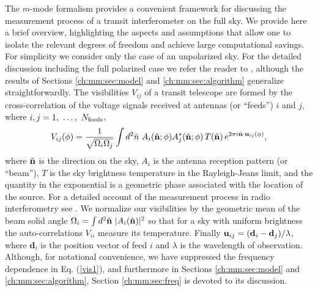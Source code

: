 The $m$-mode formalism provides a convenient framework for discussing the measurement process of a transit interferometer on the full sky. We provide here a brief overview, highlighting the aspects and assumptions that allow one to isolate the relevant degrees of freedom and achieve large computational savings. For simplicity we consider only the case of an unpolarized sky. For the detailed discussion including the full polarized case we refer the reader to \cite{mmodes2}, although the results of Sections \ref{ch:mm:sec:model} and \ref{ch:mm:sec:algorithm} generalize straightforwardly. The visibilities $V_{ij}$ of a transit telescope are formed by the cross-correlation of the voltage signals received at antennas (or ``feeds'') $i$ and $j$, where $i,j=1,~\dots,~N_{\rm feeds}$,
\begin{equation}
V_{ij}(\phi) = \frac{1}{\sqrt{\Omega_{i}\Omega_{j}}} \int d^2\hat{n} ~ A_i(\hat{\mathbf{n}}; \phi) A^*_j(\hat{\mathbf{n}}; \phi) \, T(\hat{\mathbf{n}}) \, e^{2\pi i\hat{\mathbf{n}} \cdot \mathbf{u}_{ij}(\phi)},
\label{vis1}
\end{equation}
 where $\hat{\mathbf{n}}$ is the direction on the sky, $A_i$ is the antenna reception pattern (or ``beam''), $T$ is the sky brightness temperature in the Rayleigh-Jeans limit, and the quantity in the exponential is a geometric phase associated with the location of the source. For a detailed account of the measurement process in radio interferometry see \cite{radio1}. We normalize our visibilities by the geometric mean of the beam solid angle $\Omega_i =\int d^2\hat{\mathbf{n}}~|A_i({\hat{\mathbf{n}}})|^2$ so that for a sky with uniform brightness the auto-correlations $V_{ii}$ measure its temperature. Finally ${\bf u}_{ij} = (\mathbf{d}_{i} - \mathbf{d}_{j})/\lambda$, where $\mathbf{d}_{i}$ is the position vector of feed $i$ and $\lambda$ is the wavelength of observation. Although, for notational convenience, we have suppressed the frequency dependence in Eq. (\ref{vis1}), and furthermore in Sections \ref{ch:mm:sec:model} and \ref{ch:mm:sec:algorithm}, Section \ref{ch:mm:sec:freq} is devoted to its discussion.

